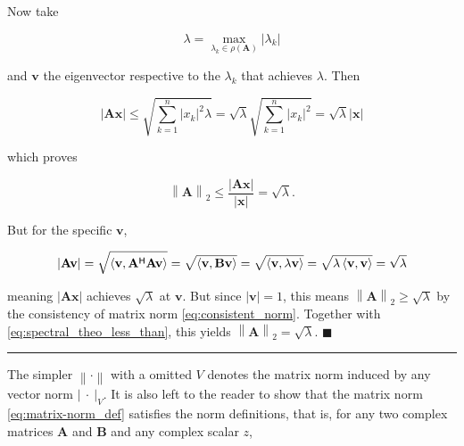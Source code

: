 	Now take

\begin{equation} \lambda = \max_{\lambda_k\in\rho\left(\mathbf{A}\right)} \left\lvert\lambda_k\right\rvert\end{equation}

	\noindent and $\mathbf{v}$ the eigenvector respective to the $\lambda_k$ that achieves $\lambda$. Then

\begin{equation} \left\lvert \mathbf{Ax}\right\rvert \leq \sqrt{\sum_{k=1}^n \left\lvert x_k\right\rvert^2 \lambda} = \sqrt{\lambda} \sqrt{\sum_{k=1}^n \left\lvert x_k\right\rvert^2} = \sqrt{\lambda} \left\lvert\mathbf{x}\right\rvert\end{equation}

	\noindent which proves

\begin{equation} \left\lVert\mathbf{A}\right\rVert_2 \leq \dfrac{\left\vert \mathbf{Ax}\right\rvert}{\left\lvert\mathbf{x}\right\rvert} =  \sqrt{\lambda}. \label{eq:spectral_theo_less_than}\end{equation}

	But for the specific $\mathbf{v}$,

\begin{equation} \left\lvert \mathbf{Av}\right\rvert = \sqrt{\left<\mathbf{v},\mathbf{A}^{\mathsf{H}}\mathbf{Av}\right>} = \sqrt{\left<\mathbf{v},\mathbf{Bv}\right>} = \sqrt{\left<\mathbf{v}, \lambda \mathbf{v}\right>} = \sqrt{\lambda \left<\mathbf{v}, \mathbf{v}\right>} = \sqrt{\lambda}\end{equation}

	\noindent meaning $\left\lvert \mathbf{Ax}\right\rvert$ achieves $\sqrt{\lambda}$ at $\mathbf{v}$. But since $\left\lvert\mathbf{v}\right\rvert = 1$, this means $\left\lVert\mathbf{A}\right\rVert_2 \geq \sqrt{\lambda}$ by the consistency of matrix norm \eqref{eq:consistent_norm}. Together with \eqref{eq:spectral_theo_less_than}, this yields $\left\lVert\mathbf{A}\right\rVert_2 = \sqrt{\lambda}$.
\hfill$\blacksquare$
\vspace{5mm}
\hrule
\vspace{5mm} %

	The simpler $\left\lVert\cdot\right\rVert$ with a omitted $V$ denotes the matrix norm induced by any vector norm $\left\lvert\ \cdot\ \right\rvert_V$. It is also left to the reader to show that the matrix norm \eqref{eq:matrix-norm_def} satisfies the norm definitions, that is, for any two complex matrices $\mathbf{A}$ and $\mathbf{B}$ and any complex scalar $z$,

